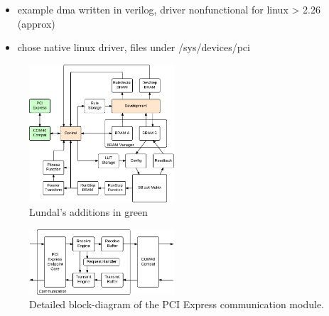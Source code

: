 
\TODO

\begin{itemize}
    \item example dma written in verilog, driver nonfunctional for linux > 2.26 (approx)
    \item chose native linux driver, files under /sys/devices/pci
\end{itemize}

\begin{figure}[!ht]
    \centering
    \includegraphics[width=0.48\textwidth]{figures/overview-lundal}
    \caption{Lundal's additions in green}
    \label{fig:overview-lundal}
\end{figure}

\begin{figure}[!ht]
    \centering
    \includegraphics[width=0.48\textwidth]{figures/details-communication}
    \caption{Detailed block-diagram of the PCI Express communication module.}
    \label{fig:details-communication}
\end{figure}

